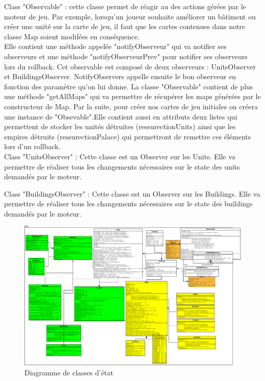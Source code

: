 \documentclass[12pt,a4paper]{article}
\begin{document}
Class "Observable" : cette classe permet de réagir au des actions gérées par le moteur de jeu. Par exemple, lorsqu'un joueur souhaite améliorer un bâtiment ou créer une unité sur la carte de jeu, il faut que les cartes contenues dans notre classe Map soient modifées en conséquence.\\ Elle contient une méthode appelée "notifyObserveur" qui va notifier ses observeurs et une méthode "notifyObserveurPrev" pour notifier ses observeurs lors du rollback.  Cet observable est composé de deux observeurs : UnitsObserver et BuildingsObserver. NotifyObservers appelle ensuite le bon observeur en fonction des paramètre qu'on lui donne. La classe "Observable" contient de plus une méthode "getAllMaps" qui va permettre de récupérer les maps générées par le constructeur de Map. Par la suite, pour créer nos cartes de jeu initiales on créera une instance de "Obsevable".Elle contient aussi en attributs deux listes qui permettent de stocker les unités détruites (ressurectionUnits) ainsi que les empires détruits (ressurectionPalace) qui permettront de remettre ces éléments lors d'un rollback.\\

Class "UnitsObserver" : Cette classe est un Observer sur les Units. Elle va permettre de réaliser tous les changements nécessaires sur le state des units demandés par le moteur.

Class "BuildingsObserver" : Cette classe est un Observer sur les Buildings. Elle va permettre de réaliser tous les changements nécessaires sur le state des buildings demandés par le moteur.

\begin{figure}[!ht]
\centering
    \includegraphics[width=1\textwidth]{ressources/state.png}
     \caption{Diagramme de classes d'état}
\end{figure}
\end{document}
